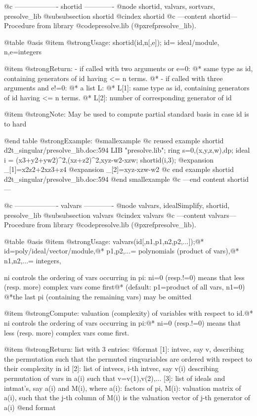 @c ------------------- shortid -------------
@node shortid, valvars, sortvars, presolve_lib
@subsubsection shortid
@cindex shortid
@c ---content shortid---
Procedure from library @code{presolve.lib} (@pxref{presolve_lib}).

@table @asis
@item @strong{Usage:}
shortid(id,n[,e]); id= ideal/module, n,e=integers

@item @strong{Return:}
- if called with two arguments or e=0:
@* same type as id, containing generators of id having <= n terms.
@* - if called with three arguments and e!=0:
@* a list L:
@* L[1]: same type as id, containing generators of id having <= n terms.
@* L[2]: number of corresponding generator of id

@item @strong{Note:}
May be used to compute partial standard basis in case id is to hard

@end table
@strong{Example:}
@smallexample
@c reused example shortid d2t_singular/presolve_lib.doc:594 
LIB "presolve.lib";
ring s=0,(x,y,z,w),dp;
ideal i = (x3+y2+yw2)^2,(xz+z2)^2,xyz-w2-xzw; 
shortid(i,3);
@expansion{} _[1]=x2z2+2xz3+z4
@expansion{} _[2]=xyz-xzw-w2
@c end example shortid d2t_singular/presolve_lib.doc:594
@end smallexample
@c ---end content shortid---

@c ------------------- valvars -------------
@node valvars, idealSimplify, shortid, presolve_lib
@subsubsection valvars
@cindex valvars
@c ---content valvars---
Procedure from library @code{presolve.lib} (@pxref{presolve_lib}).

@table @asis
@item @strong{Usage:}
valvars(id[,n1,p1,n2,p2,...]);@*
id=poly/ideal/vector/module,@*
p1,p2,...= polynomials (product of vars),@*
n1,n2,...= integers,

ni controls the ordering of vars occurring in pi: ni=0 (resp.!=0) means
that less (resp. more) complex vars come first@*
(default: p1=product of all vars, n1=0)
@*the last pi (containing the remaining vars) may be omitted

@item @strong{Compute:}
valuation (complexity) of variables with respect to id.@*
ni controls the ordering of vars occurring in pi:@*
ni=0 (resp.!=0) means that less (resp. more) complex vars come first.

@item @strong{Return:}
list with 3 entries:
  @format
  [1]: intvec, say v, describing the permutation such that the permuted
       ringvariables are ordered with respect to their complexity in id
  [2]: list of intvecs, i-th intvec, say v(i) describing permutation
       of vars in a(i) such that v=v(1),v(2),...
  [3]: list of ideals and intmat's, say a(i) and M(i), where
       a(i): factors of pi,
       M(i): valuation matrix of a(i), such that the j-th column of M(i)
             is the valuation vector of j-th generator of a(i)
         @end format

